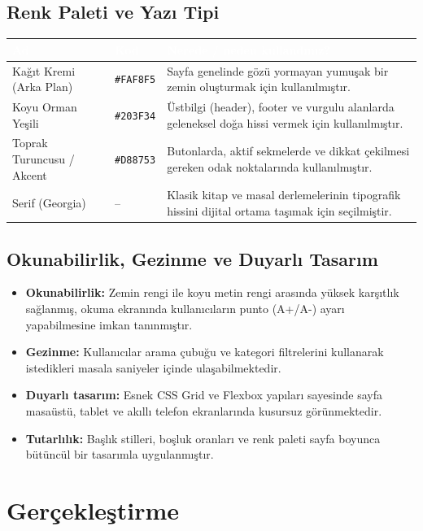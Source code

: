 \documentclass[12pt,a4paper]{article}
\begin{document}
\subsection{Renk Paleti ve Yazı Tipi}
\begin{center}
\begin{tabular}{@{}llp{6.4cm}@{}}
\toprule
\rowcolor{ana}\textcolor{white}{\textbf{Ad}} & \textcolor{white}{\textbf{Kod}} & \textcolor{white}{\textbf{Nerede / neden kullandınız?}} \\
\midrule
Kağıt Kremi (Arka Plan) & \texttt{\#FAF8F5} & Sayfa genelinde gözü yormayan yumuşak bir zemin oluşturmak için kullanılmıştır. \\
Koyu Orman Yeşili & \texttt{\#203F34} & Üstbilgi (header), footer ve vurgulu alanlarda geleneksel doğa hissi vermek için kullanılmıştır. \\
Toprak Turuncusu / Akcent & \texttt{\#D88753} & Butonlarda, aktif sekmelerde ve dikkat çekilmesi gereken odak noktalarında kullanılmıştır. \\
Serif (Georgia) & -- & Klasik kitap ve masal derlemelerinin tipografik hissini dijital ortama taşımak için seçilmiştir. \\
\bottomrule
\end{tabular}
\end{center}

\subsection{Okunabilirlik, Gezinme ve Duyarlı Tasarım}
\begin{itemize}
  \item \textbf{Okunabilirlik:} Zemin rengi ile koyu metin rengi arasında yüksek karşıtlık sağlanmış, okuma ekranında kullanıcıların punto (A+/A-) ayarı yapabilmesine imkan tanınmıştır.
  \item \textbf{Gezinme:} Kullanıcılar arama çubuğu ve kategori filtrelerini kullanarak istedikleri masala saniyeler içinde ulaşabilmektedir.
  \item \textbf{Duyarlı tasarım:} Esnek CSS Grid ve Flexbox yapıları sayesinde sayfa masaüstü, tablet ve akıllı telefon ekranlarında kusursuz görünmektedir.
  \item \textbf{Tutarlılık:} Başlık stilleri, boşluk oranları ve renk paleti sayfa boyunca bütüncül bir tasarımla uygulanmıştır.
\end{itemize}

\section{Gerçekleştirme}
\end{document}

